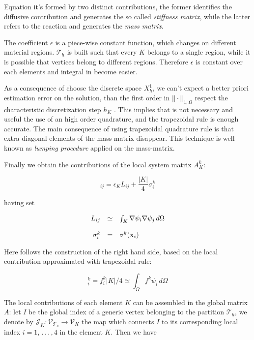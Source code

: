 Equation  it's formed by two distinct contributions, the former identifies the diffusive contribution and generates the so called \textit{stiffness matrix}, while the latter refers to the reaction and generates the \textit{mass matrix}.

The coefficient $\epsilon$ is a piece-wise constant function, which changes on different material regions. $\mathcal{T}_h$ is built such that every $K$ belongs to a single region, while it is possible that vertices belong to different regions. Therefore $\epsilon$ is constant over each elements and integral in  become easier.

As a consequence of choose the discrete space $X^1_{h}$,  we can't expect a better priori estimation error on the solution, than the first order in $||\cdot||_{1,\Omega}$ respect the characteristic discretization step $h_K$ \cite{quarteroni:modnum}. This implies that is not necessary and useful the use of an high order quadrature, and the trapezoidal rule is enough accurate. 
The main consequence of using trapezoidal quadrature rule is that extra-diagonal elements of the mass-matrix disappear.
This technique is well known as \textit{lumping procedure} applied on the mass-matrix.

Finally we obtain the contributions of the local system matrix $A_K^k$:

\begin{equation}
[A_K^k]_{ij}  = \epsilon_K
L_{ij}
+
\dfrac{|K|}{4} \sigma^k_i
\end{equation}

having set

\begin{equation}
\begin{array}{rcl}
L_{ij} & \simeq & \int_K \nabla \psi_i  \nabla \psi_j \, d\Omega \\ \\
\sigma^k_i & =  &\sigma^k(\mathbf{x}_i)
\end{array}
\end{equation}

Here follows the construction of the right hand side, based on the local contribution approximated with trapezoidal rule:

\begin{equation}
[F_K]_i^k =  f^k_i |K| / 4 \simeq \int_{\Omega} f^k \psi_i \, d\Omega 
\end{equation}

The local contributions of each element $K$ can be assembled in the global matrix $A$: let $I$ be the global index of a generic vertex belonging to the partition $\mathcal{T}_h$, we denote by $\mathcal{J}_K: \mathcal{V}_{\mathcal{T}_h} \rightarrow \mathcal{V}_{K}$ the map which connects $I$ to its corresponding local index $i=1, \, . \, . \, . \, , 4$ in the element $K$. Then we have 

